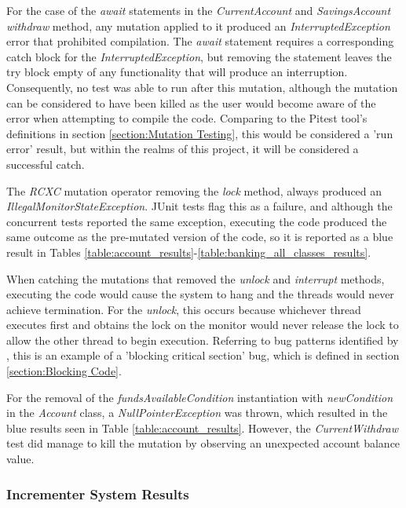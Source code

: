 \documentclass[a4paper,12pt]{article}
\begin{document}
For the case of the \textit{await} statements in the \textit{CurrentAccount} and \textit{SavingsAccount withdraw} method, any mutation applied to it produced an \textit{InterruptedException} error that prohibited compilation. The \textit{await} statement requires a corresponding catch block for the \textit{InterruptedException}, but removing the statement leaves the try block empty of any functionality that will produce an interruption. Consequently, no test was able to run after this mutation, although the mutation can be considered to have been killed as the user would become aware of the error when attempting to compile the code. Comparing to the Pitest tool's definitions in section \ref{section:Mutation Testing}, this would be considered a 'run error' result, but within the realms of this project, it will be considered a successful catch. 

The \textit{RCXC} mutation operator removing the \textit{lock} method, always produced an \textit{IllegalMonitorStateException}. JUnit tests flag this as a failure, and although the concurrent tests reported the same exception, executing the code produced the same outcome as the pre-mutated version of the code, so it is reported as a blue result in Tables \ref{table:account_results}-\ref{table:banking_all_classes_results}.

When catching the mutations that removed the \textit{unlock} and \textit{interrupt} methods, executing the code would cause the system to hang and the threads would never achieve termination. For the \textit{unlock}, this occurs because whichever thread executes first and obtains the lock on the monitor would never release the lock to allow the other thread to begin execution. Referring to bug patterns identified by \citet{bradbury06}, this is an example of a 'blocking critical section' bug, which is defined in section \ref{section:Blocking Code}.     

For the removal of the \textit{fundsAvailableCondition} instantiation with \textit{newCondition} in the \textit{Account} class, a \textit{NullPointerException} was thrown, which resulted in the blue results seen in Table \ref{table:account_results}. However, the \textit{CurrentWithdraw} test did manage to kill the mutation by observing an unexpected account balance value.  

\subsubsection{Incrementer System Results} \label{section:Incrementer System Results} 
\end{document}
